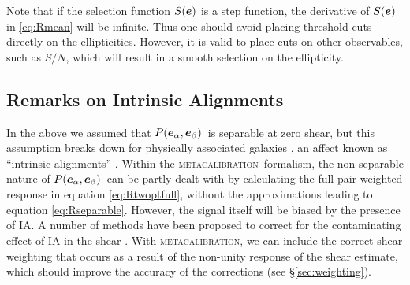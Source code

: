\documentclass[iop, twocolappendix, appendixfloats, numberedappendix, apj]{emulateapj}
\newcommand{\snr}{$S/N$}
\newcommand{\vest}{\mbox{\boldmath $e$}}
\newcommand{\mcal}{\textsc{metacalibration}}
\newcommand{\probe}{\mbox{$P(\vest_\alpha, \vest_\beta)$}}
\begin{document}
Note that if the selection function $S(\vest)$ is a step function, the
derivative of $S(\vest)$ in \ref{eq:Rmean} will be infinite.  Thus one should
avoid placing threshold cuts directly on the ellipticities.  However, it is
valid to place cuts on other observables, such as \snr, which will result in a
smooth selection on the ellipticity.


\subsection{Remarks on Intrinsic Alignments} \label{sec:IA}

In the above we assumed that \probe\ is separable at zero shear, but this
assumption breaks down for physically associated galaxies
\citep[e.g.][]{HirataIntrinsicAlign07}, an affect known as ``intrinsic
alignments'' \citep[IA; for a recent review, see][]{TroxelIAReview2015}.
Within the \mcal\ formalism, the non-separable nature of \probe\ can be partly
dealt with by calculating the full pair-weighted response in equation
\ref{eq:Rtwoptfull}, without the approximations leading to equation
\ref{eq:Rseparable}.  However, the signal itself will be biased by the presence
of IA.  A number of methods  have been proposed to correct for the
contaminating effect of IA in the shear \citep{TroxelIAReview2015}.  With
\mcal, we can include the correct shear weighting that occurs as a result of
the non-unity response of the shear estimate, which should improve the accuracy
of the corrections (see \S \ref{sec:weighting}).
\end{document}
